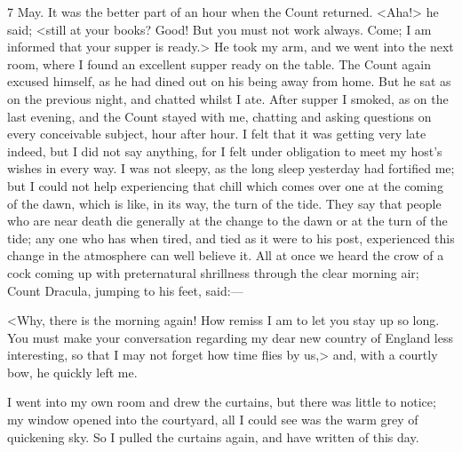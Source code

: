 \begin{diary}{7 May.}
It was the better part of an hour when the Count returned. <Aha!> he said; <still at your books? Good! But you must not work always. Come; I am informed that your supper is ready.> He took my arm, and we went into the next room, where I found an excellent supper ready on the table. The Count again excused himself, as he had dined out on his being away from home. But he sat as on the previous night, and chatted whilst I ate. After supper I smoked, as on the last evening, and the Count stayed with me, chatting and asking questions on every conceivable subject, hour after hour. I felt that it was getting very late indeed, but I did not say anything, for I felt under obligation to meet my host's wishes in every way. I was not sleepy, as the long sleep yesterday had fortified me; but I could not help experiencing that chill which comes over one at the coming of the dawn, which is like, in its way, the turn of the tide. They say that people who are near death die generally at the change to the dawn or at the turn of the tide; any one who has when tired, and tied as it were to his post, experienced this change in the atmosphere can well believe it. All at once we heard the crow of a cock coming up with preternatural shrillness through the clear morning air; Count Dracula, jumping to his feet, said:—

<Why, there is the morning again! How remiss I am to let you stay up so long. You must make your conversation regarding my dear new country of England less interesting, so that I may not forget how time flies by us,> and, with a courtly bow, he quickly left me.

I went into my own room and drew the curtains, but there was little to notice; my window opened into the courtyard, all I could see was the warm grey of quickening sky. So I pulled the curtains again, and have written of this day.
\end{diary}
 


